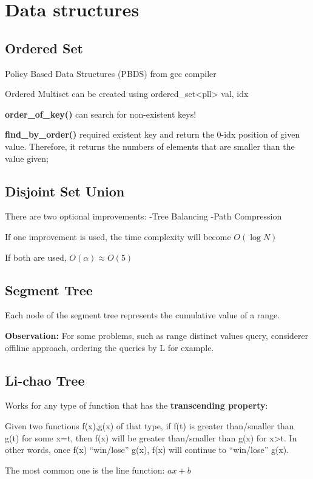 \chapter{Data structures}

\section{Ordered Set}

    Policy Based Data Structures (PBDS) from gcc compiler

    Ordered Multiset can be created using ordered\_set<pll> {val, idx}

    \textbf{order\_of\_key()} can search for non-existent keys!
    
    \textbf{find\_by\_order()} required existent key and return the 0-idx position of given value.
    Therefore, it returns the numbers of elements that are smaller than the value given;


\section{Disjoint Set Union}

    There are two optional improvements:
        -Tree Balancing 
        -Path Compression

    If one improvement is used, 
    the time complexity will become $O(\log{N})$

    If both are used, $O(\alpha) \approx O(5)$


\section{Segment Tree}

    Each node of the segment tree represents the cumulative value of a range.

    \textbf{Observation:} For some problems, such as range distinct values query,
    considerer offiline approach, ordering the queries by L for example. 

    
\section{Li-chao Tree}

    Works for any type of function that has the \textbf{transcending property}:

    Given two functions f(x),g(x) of that type, 
    if f(t) is greater than/smaller than g(t) for some x=t,
    then f(x) will be greater than/smaller than g(x) for x>t.
    In other words, once f(x) “win/lose” g(x), f(x) will continue to “win/lose” g(x).

    The most common one is the line function: $ ax + b $
    